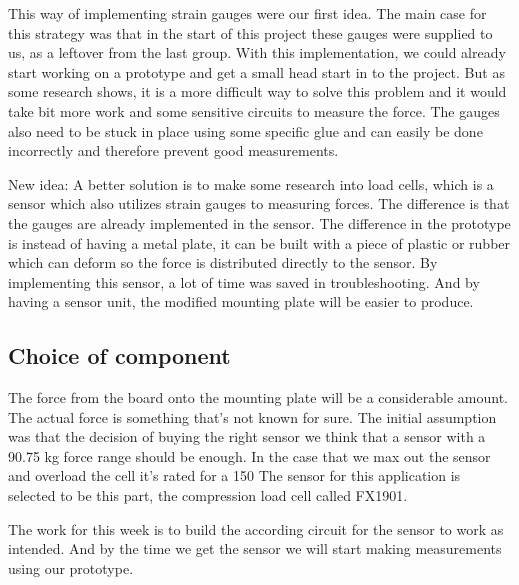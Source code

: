 
This way of implementing strain gauges were our first idea. 
The main case for this strategy was that in the start of this project these gauges were supplied to us, as a leftover from the last group. With this implementation, we could already start working on a prototype and get a small head start in to the project. But as some research shows, it is a more difficult way to solve this problem and it would take bit more work and some sensitive circuits to measure the force. The gauges also need to be stuck in place using some specific glue and can easily be done incorrectly and therefore prevent good measurements.

New idea:
A better solution is to make some research into load cells, which is a sensor which also utilizes strain gauges to measuring forces. The difference is that the gauges are already implemented in the sensor. The difference in the prototype is instead of having a metal plate, it can be built with a piece of plastic or rubber which can deform so the force is distributed directly to the sensor. By implementing this sensor, a lot of time was saved in troubleshooting. And by having a sensor unit, the modified mounting plate will be easier to produce. 
 

\subsection{Choice of component}
The force from the board onto the mounting plate will be a considerable amount. The actual force is something that’s not known for sure. The initial assumption was that the decision of buying the right sensor we think that a sensor with a 90.75 kg force range should be enough. In the case that we max out the sensor and overload the cell it's rated for a 150%
The sensor for this application is selected to be this part, the compression load cell called FX1901. 
 

The work for this week is to build the according circuit for the sensor to work as intended. And by the time we get the sensor we will start making measurements using our prototype.
